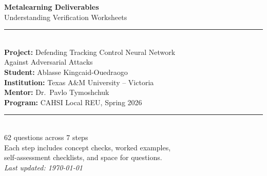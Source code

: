 \documentclass[11pt, letterpaper]{article}
\begin{document}
\begin{titlepage}
	\centering
	\vspace*{2cm}
	
	{\Huge\bfseries\color{NavyBlue} Metalearning Deliverables}\\[0.6cm]
	{\Large\color{MidnightBlue} Understanding Verification Worksheets}\\[1.5cm]
	
	\rule{0.8\textwidth}{0.4pt}\\[1.2cm]
	
	{\large\textbf{Project:} Defending Tracking Control Neural Network\\
	Against Adversarial Attacks}\\[0.8cm]
	
	{\large\textbf{Student:} Ablasse Kingcaid-Ouedraogo}\\[0.3cm]
	{\large\textbf{Institution:} Texas A\&M University -- Victoria}\\[0.3cm]
	{\large\textbf{Mentor:} Dr.\ Pavlo Tymoshchuk}\\[0.3cm]
	{\large\textbf{Program:} CAHSI Local REU, Spring 2026}\\[1.5cm]
	
	\rule{0.8\textwidth}{0.4pt}\\[1.2cm]
	
	{\large 62 questions across 7 steps}\\[0.4cm]
	{\normalsize Each step includes concept checks, worked examples,\\
	self-assessment checklists, and space for questions.}\\[2cm]
	
	{\small\textit{Last updated: \today}}
	
\end{titlepage}

\tableofcontents
\clearpage


\clearpage


\clearpage


\clearpage


\clearpage


\clearpage


\clearpage


\clearpage


\end{document}

